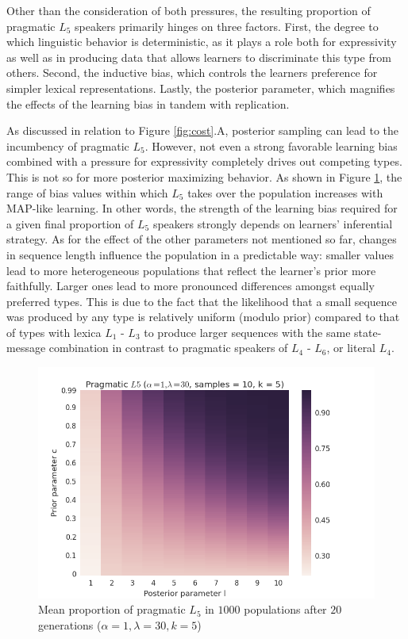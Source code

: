 \documentclass[a4paper]{article}
\begin{document}
Other than the consideration of both pressures, the resulting proportion of pragmatic $L_5$ speakers primarily hinges on three factors. First, the degree to which linguistic behavior is deterministic, as it plays a role both for expressivity as well as in producing data that allows learners to discriminate this type from others. Second, the inductive bias, which controls the learners preference for simpler lexical representations. Lastly, the posterior parameter, which magnifies the effects of the learning bias in tandem with replication. 

As discussed in relation to Figure \ref{fig:cost}.A, posterior sampling can lead to the incumbency of pragmatic $L_5$. However, not even a strong favorable learning bias combined with a pressure for expressivity completely drives out competing types. This is not so for more posterior maximizing behavior. As shown in Figure \ref{fig:prior-posterior}, the range of bias values within which $L_5$ takes over the population increases with MAP-like learning. In other words, the strength of the learning bias required for a given final proportion of $L_5$ speakers strongly depends on learners' inferential strategy. As for the effect of the other parameters not mentioned so far, changes in sequence length influence the population in a predictable way: smaller values lead to more heterogeneous populations that reflect the learner's prior more faithfully. Larger ones lead to more pronounced differences amongst equally preferred types. This is due to the fact that the likelihood that a small sequence was produced by any type is relatively uniform (modulo prior) compared to that of types with lexica $L_1$ - $L_3$ to produce larger sequences with the same state-message combination in contrast to pragmatic speakers of $L_4$ - $L_6$, or literal $L_4$.


\begin{figure}
\centering
\includegraphics[scale=.5]{../presentations/01heatmap}
\caption{Mean proportion of pragmatic $L_5$ in $1000$ populations after $20$ generations ($\alpha = 1, \lambda = 30, k = 5$)}
\label{fig:prior-posterior}
\end{figure}
\end{document}
